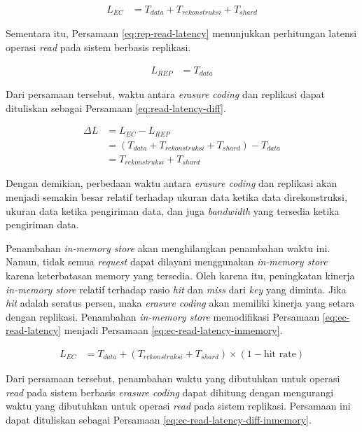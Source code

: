 \begin{enumerate}
  \begin{align}
  L_{EC} &= T_{data} + T_{rekonstruksi} + T_{shard}
  \label{eq:ec-read-latency}
  \end{align}

  Sementara itu, Persamaan \ref{eq:rep-read-latency} menunjukkan perhitungan latensi operasi \textit{read} pada sistem berbasis replikasi.

  \begin{align}
  L_{REP} &= T_{data}
  \label{eq:rep-read-latency}
  \end{align}

  Dari persamaan tersebut, waktu antara \textit{erasure coding} dan replikasi dapat dituliskan sebagai Persamaan \ref{eq:read-latency-diff}.

  \begin{align}
  \Delta L &= L_{EC} - L_{REP} \\
  &= (T_{data} + T_{rekonstruksi} + T_{shard}) - T_{data} \\
  &= T_{rekonstruksi} + T_{shard}
  \label{eq:read-latency-diff}
  \end{align}

  Dengan demikian, perbedaan waktu antara \textit{erasure coding} dan replikasi akan menjadi semakin besar relatif terhadap ukuran data ketika data direkonstruksi, ukuran data ketika pengiriman data, dan juga \textit{bandwidth} yang tersedia ketika pengiriman data.
  
  Penambahan \textit{in-memory store} akan menghilangkan penambahan waktu ini. Namun, tidak semua \textit{request} dapat dilayani menggunakan \textit{in-memory store} karena keterbatasan memory yang tersedia. Oleh karena itu, peningkatan kinerja \textit{in-memory store} relatif terhadap rasio \textit{hit} dan \textit{miss} dari \textit{key} yang diminta. Jika \textit{hit} adalah seratus persen, maka \textit{erasure coding} akan memiliki kinerja yang setara dengan replikasi. Penambahan \textit{in-memory store} memodifikasi Persamaan \ref{eq:ec-read-latency} menjadi Persamaan \ref{eq:ec-read-latency-inmemory}.

  \begin{align}
    L_{EC} &= T_{data} + (T_{rekonstruksi} + T_{shard}) \times (1 - \text{hit rate})
    \label{eq:ec-read-latency-inmemory}
  \end{align}

  Dari persamaan tersebut, penambahan waktu yang dibutuhkan untuk operasi \textit{read} pada sistem berbasis \textit{erasure coding} dapat dihitung dengan mengurangi waktu yang dibutuhkan untuk operasi \textit{read} pada sistem replikasi. Persamaan ini dapat dituliskan sebagai Persamaan \ref{eq:ec-read-latency-diff-inmemory}.


\end{enumerate}
